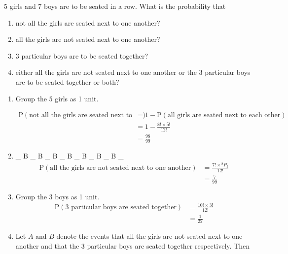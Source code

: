 \documentclass[11pt,a4paper]{book}
\begin{document}
\begin{example}

5 girls and 7 boys are to be seated in a row. What is the probability
that

\begin{enumerate}[label=(\alph*)]

\item not all the girls are seated next to one another?

\item all the girls are not seated next to one another?

\item 3 particular boys are to be seated together?

\item either all the girls are not seated next to one another or
the 3 particular boys are to be seated together or both?

\end{enumerate}

\Solution

\begin{enumerate}[label=(\alph*)]

\item  Group the 5 girls as 1 unit.

\begin{align*}
\text{P}\left(\text{not all the girls are seated next to one another}\right) & =1-\text{P}\left(\text{all girls are seated next to each other}\right)\\
 & =1-\frac{8!\times5!}{12!}\\
 & =\frac{98}{99}
\end{align*}

\item  \_ B \_ B \_ B \_ B \_ B \_ B \_ B \_
\begin{align*}
\text{P}\left(\text{all the girls are not seated next to one another}\right) & =\frac{7!\times{}^{8}P_{5}}{12!}\\
 & =\frac{7}{99}
\end{align*}

\item Group the 3 boys as 1 unit.
\begin{align*}
\text{P}\left(\text{3 particular boys are seated together}\right) & =\frac{10!\times3!}{12!}\\
 & =\frac{1}{22}
\end{align*}

\item  Let $A$ and $B$ denote the events that all the girls are
not seated next to one another and that the 3 particular boys are
seated together respectively. Then


\end{enumerate}
\end{example}
\end{document}
